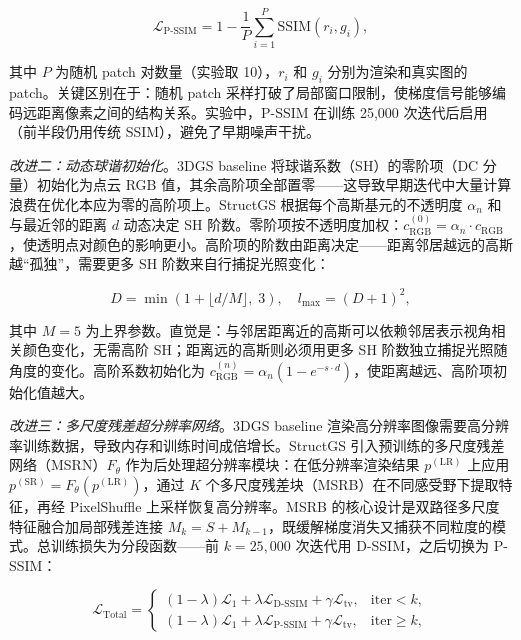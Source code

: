 \begin{equation}
\mathcal{L}_{\text{P-SSIM}} = 1 - \frac{1}{P} \sum_{i=1}^{P} \mathrm{SSIM}(r_i, g_i),
\end{equation}

其中 $P$ 为随机 patch 对数量（实验取 10），$r_i$ 和 $g_i$ 分别为渲染和真实图的 patch。关键区别在于：随机 patch 采样打破了局部窗口限制，使梯度信号能够编码远距离像素之间的结构关系。实验中，P-SSIM 在训练 25,000 次迭代后启用（前半段仍用传统 SSIM），避免了早期噪声干扰。

\textit{改进二：动态球谐初始化}。3DGS baseline 将球谐系数（SH）的零阶项（DC 分量）初始化为点云 RGB 值，其余高阶项全部置零——这导致早期迭代中大量计算浪费在优化本应为零的高阶项上。StructGS 根据每个高斯基元的不透明度 $\alpha_n$ 和与最近邻的距离 $d$ 动态决定 SH 阶数。零阶项按不透明度加权：$c_{\mathrm{RGB}}^{(0)} = \alpha_n \cdot c_{\mathrm{RGB}}$，使透明点对颜色的影响更小。高阶项的阶数由距离决定——距离邻居越远的高斯越“孤独”，需要更多 SH 阶数来自行捕捉光照变化：

\begin{equation}
D = \min\!\left(1 + \lfloor d / M \rfloor,\; 3\right), \quad l_{\max} = (D+1)^2,
\end{equation}

其中 $M=5$ 为上界参数。直觉是：与邻居距离近的高斯可以依赖邻居表示视角相关颜色变化，无需高阶 SH；距离远的高斯则必须用更多 SH 阶数独立捕捉光照随角度的变化。高阶系数初始化为 $c_{\mathrm{RGB}}^{(n)} = \alpha_n (1 - e^{-s \cdot d})$，使距离越远、高阶项初始化值越大。

\textit{改进三：多尺度残差超分辨率网络}。3DGS baseline 渲染高分辨率图像需要高分辨率训练数据，导致内存和训练时间成倍增长。StructGS 引入预训练的多尺度残差网络（MSRN）$F_\theta$ 作为后处理超分辨率模块：在低分辨率渲染结果 $p^{(\mathrm{LR})}$ 上应用 $p^{(\mathrm{SR})} = F_\theta(p^{(\mathrm{LR})})$，通过 $K$ 个多尺度残差块（MSRB）在不同感受野下提取特征，再经 PixelShuffle 上采样恢复高分辨率。MSRB 的核心设计是双路径多尺度特征融合加局部残差连接 $M_k = S + M_{k-1}$，既缓解梯度消失又捕获不同粒度的模式。总训练损失为分段函数——前 $k=25{,}000$ 次迭代用 D-SSIM，之后切换为 P-SSIM：

\begin{equation}
\mathcal{L}_{\mathrm{Total}} = \begin{cases} (1-\lambda)\mathcal{L}_1 + \lambda\mathcal{L}_{\text{D-SSIM}} + \gamma\mathcal{L}_{\mathrm{tv}}, & \text{iter} < k, \\ (1-\lambda)\mathcal{L}_1 + \lambda\mathcal{L}_{\text{P-SSIM}} + \gamma\mathcal{L}_{\mathrm{tv}}, & \text{iter} \geq k, \end{cases}
\end{equation}

